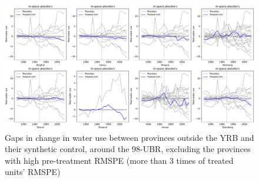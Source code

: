 \begin{figure}
    \includegraphics[width=0.9\linewidth]{img/ch5/98placebo.pdf}
    \centering
    \caption{Gaps in change in water use between provinces outside the YRB and their synthetic control, around the 98-UBR, excluding the provinces with high pre-treatment RMSPE (more than $3$ times of treated units' RMSPE)}\label{fig:98placebo}
\end{figure}
